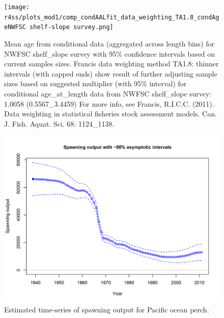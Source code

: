 \documentclass[12pt,]{article}
\begin{document}
\begin{figure}
\centering
\texttt{[image: r4ss/plots\_mod1/comp\_condAALfit\_data\_weighting\_TA1.8\_condAgeNWFSC shelf-slope survey.png]}
\caption{Mean age from conditional data (aggregated across length bins)
for NWFSC shelf\_slope survey with 95\% confidence intervals based on
current samples sizes. Francis data weighting method TA1.8: thinner
intervals (with capped ends) show result of further adjusting sample
sizes based on suggested multiplier (with 95\% interval) for conditional
age\_at\_length data from NWFSC shelf\_slope survey: 1.0058
(0.5567\_3.4459) For more info, see Francis, R.I.C.C. (2011). Data
weighting in statistical fisheries stock assessment models. Can. J.
Fish. Aquat. Sci. 68: 1124\_1138. \label{fig:weighting_nwfsccombo}}
\end{figure}

\FloatBarrier

\begin{figure}
\centering
\includegraphics{r4ss/plots_mod1/ts7_Spawning_output_with_95_asymptotic_intervals_intervals.png}
\caption{Estimated time-series of spawning output for Pacific ocean
perch. \label{fig:ssb}}
\end{figure}

\FloatBarrier
\end{document}
